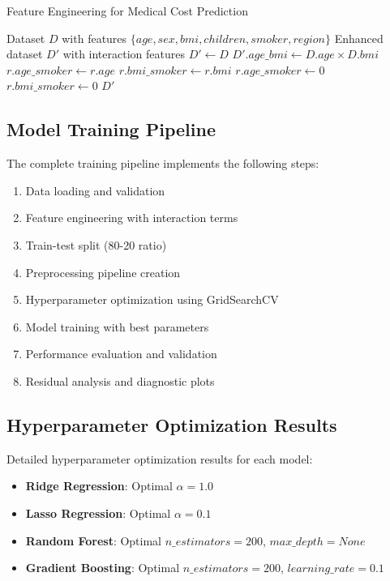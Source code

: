 \documentclass[times, twoside, watermark]{zHenriquesLab-StyleBioRxiv}
\begin{document}
\begin{algorithm}
\caption{Feature Engineering for Medical Cost Prediction}
\begin{algorithmic}[1]
\REQUIRE Dataset $D$ with features $\{age, sex, bmi, children, smoker, region\}$
\ENSURE Enhanced dataset $D'$ with interaction features
\STATE $D' \leftarrow D$
\STATE $D'.age\_bmi \leftarrow D.age \times D.bmi$
        \STATE $r.age\_smoker \leftarrow r.age$
        \STATE $r.bmi\_smoker \leftarrow r.bmi$
    \ELSE
        \STATE $r.age\_smoker \leftarrow 0$
        \STATE $r.bmi\_smoker \leftarrow 0$
    \ENDIF
\ENDFOR
\RETURN $D'$
\end{algorithmic}
\end{algorithm}

\subsection*{Model Training Pipeline}

The complete training pipeline implements the following steps:

\begin{enumerate}
\item Data loading and validation
\item Feature engineering with interaction terms
\item Train-test split (80-20 ratio)
\item Preprocessing pipeline creation
\item Hyperparameter optimization using GridSearchCV
\item Model training with best parameters
\item Performance evaluation and validation
\item Residual analysis and diagnostic plots
\end{enumerate}

\subsection*{Hyperparameter Optimization Results}

Detailed hyperparameter optimization results for each model:

\begin{itemize}
\item \textbf{Ridge Regression}: Optimal $\alpha = 1.0$
\item \textbf{Lasso Regression}: Optimal $\alpha = 0.1$
\item \textbf{Random Forest}: Optimal $n\_estimators = 200$, $max\_depth = None$
\item \textbf{Gradient Boosting}: Optimal $n\_estimators = 200$, $learning\_rate = 0.1$
\end{itemize}

\end{document}

